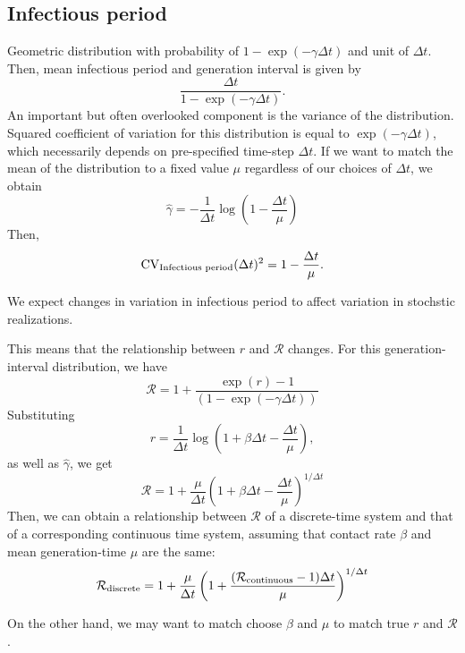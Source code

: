 \documentclass{article}
\begin{document}
\subsection{Infectious period}

Geometric distribution with probability of $1-\exp(-\gamma \Delta t)$ and unit of $\Delta t$.
Then, mean infectious period and generation interval is given by 
\begin{equation}
\frac{\Delta t}{1-\exp(-\gamma \Delta t)}.
\end{equation}
An important but often overlooked component is the variance of the distribution.
Squared coefficient of variation for this distribution is equal to $\exp(-\gamma \Delta t)$, which necessarily depends on pre-specified time-step $\Delta t$.
If we want to match the mean of the distribution to a fixed value $\mu$ regardless of our choices of $\Delta t$, we obtain 
\begin{equation}
\hat \gamma = - \frac{1}{\Delta t} \log\left(1 - \frac{\Delta t}{\mu}\right)
\end{equation}
Then,
\begin{equation}
\mathrm{CV}_{\tiny\textrm{Infectious period}}(\Delta t)^2 = 1 - \frac{\Delta t}{\mu}.
\end{equation}

We expect changes in variation in infectious period to affect variation in stochstic realizations.

This means that the relationship between $r$ and $\mathcal R$ changes.
For this generation-interval distribution, we have
\begin{equation}
\mathcal R = 1 + \frac{\exp(r) -1}{(1-\exp(-\gamma \Delta t)) }
\end{equation}
Substituting 
\begin{equation}
r = \frac{1}{\Delta t} \log \left(1 + \beta \Delta t - \frac{\Delta t}{\mu}\right),
\end{equation}
as well as $\hat \gamma$, we get
\begin{equation}
\mathcal R = 1 + \frac{\mu}{\Delta t} \left(1 + \beta \Delta t - \frac{\Delta t}{\mu}\right)^{1/\Delta t}
\end{equation}
Then, we can obtain a relationship between $\mathcal R$ of a discrete-time system and that of a corresponding continuous time system, assuming that contact rate $\beta$ and mean generation-time $\mu$ are the same:
\begin{equation}
\mathcal R_{\tiny \textrm{discrete}} = 1 + \frac{\mu}{\Delta t} \left(1 + \frac{(\mathcal R_{\tiny \textrm{continuous}}  - 1) \Delta t }{\mu}\right)^{1/\Delta t}
\end{equation}

On the other hand, we may want to match choose $\beta$ and $\mu$ to match true $r$ and $\mathcal R$.
\end{document}

